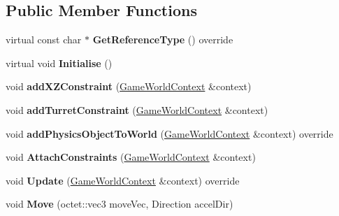 \subsection*{Public Member Functions}
\begin{DoxyCompactItemize}
\item 
\hypertarget{class_arena_1_1_player_aa22c5cdce358781bc98892b1e2829bf2}{virtual const char $\ast$ {\bfseries Get\+Reference\+Type} () override}\label{class_arena_1_1_player_aa22c5cdce358781bc98892b1e2829bf2}

\item 
\hypertarget{class_arena_1_1_player_a9b5949b4c56768c6132397360587af47}{virtual void {\bfseries Initialise} ()}\label{class_arena_1_1_player_a9b5949b4c56768c6132397360587af47}

\item 
\hypertarget{class_arena_1_1_player_ac5c4458824f47742bb3816cc3a693ccd}{void {\bfseries add\+X\+Z\+Constraint} (\hyperlink{struct_arena_1_1_game_world_context}{Game\+World\+Context} \&context)}\label{class_arena_1_1_player_ac5c4458824f47742bb3816cc3a693ccd}

\item 
\hypertarget{class_arena_1_1_player_a4d4c157ae313fc2b9560225e066b7590}{void {\bfseries add\+Turret\+Constraint} (\hyperlink{struct_arena_1_1_game_world_context}{Game\+World\+Context} \&context)}\label{class_arena_1_1_player_a4d4c157ae313fc2b9560225e066b7590}

\item 
\hypertarget{class_arena_1_1_player_a8816424a271312fd584b8cda77c9d959}{void {\bfseries add\+Physics\+Object\+To\+World} (\hyperlink{struct_arena_1_1_game_world_context}{Game\+World\+Context} \&context) override}\label{class_arena_1_1_player_a8816424a271312fd584b8cda77c9d959}

\item 
\hypertarget{class_arena_1_1_player_a4fd4eb5692672d246124137d46648093}{void {\bfseries Attach\+Constraints} (\hyperlink{struct_arena_1_1_game_world_context}{Game\+World\+Context} \&context)}\label{class_arena_1_1_player_a4fd4eb5692672d246124137d46648093}

\item 
\hypertarget{class_arena_1_1_player_ad050b166333495653886d883dae4da4a}{void {\bfseries Update} (\hyperlink{struct_arena_1_1_game_world_context}{Game\+World\+Context} \&context) override}\label{class_arena_1_1_player_ad050b166333495653886d883dae4da4a}

\item 
\hypertarget{class_arena_1_1_player_af4a1b3d8a444e4a417d29806d5b2c4e3}{void {\bfseries Move} (octet\+::vec3 move\+Vec, Direction accel\+Dir)}\label{class_arena_1_1_player_af4a1b3d8a444e4a417d29806d5b2c4e3}


\end{DoxyCompactItemize}
